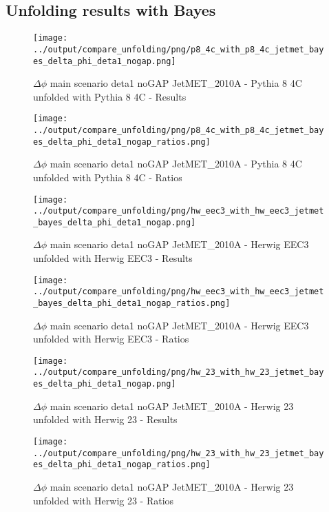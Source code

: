 \documentclass[11pt]{book}
\begin{document}
\subsection{Unfolding results with Bayes}

\begin{figure}[ht]
\centering
\texttt{[image: ../output/compare\_unfolding/png/p8\_4c\_with\_p8\_4c\_jetmet\_bayes\_delta\_phi\_deta1\_nogap.png]}
\caption{$\Delta\phi$ main scenario deta1 noGAP JetMET\_2010A - Pythia 8 4C unfolded with Pythia 8 4C - Results}
\label{p8_p8_jetmet_bayes_delta_phi_deta1_nogap_a}
\end{figure}

\begin{figure}[ht]
\centering
\texttt{[image: ../output/compare\_unfolding/png/p8\_4c\_with\_p8\_4c\_jetmet\_bayes\_delta\_phi\_deta1\_nogap\_ratios.png]}
\caption{$\Delta\phi$ main scenario deta1 noGAP JetMET\_2010A - Pythia 8 4C unfolded with Pythia 8 4C - Ratios}
\label{p8_p8_jetmet_bayes_delta_phi_deta1_nogap_b}
\end{figure}

\begin{figure}[ht]
\centering
\texttt{[image: ../output/compare\_unfolding/png/hw\_eec3\_with\_hw\_eec3\_jetmet\_bayes\_delta\_phi\_deta1\_nogap.png]}
\caption{$\Delta\phi$ main scenario deta1 noGAP JetMET\_2010A - Herwig EEC3 unfolded with Herwig EEC3 - Results}
\label{hw_eec3_hw_eec3_jetmet_bayes_delta_phi_deta1_nogap_a}
\end{figure}

\begin{figure}[ht]
\centering
\texttt{[image: ../output/compare\_unfolding/png/hw\_eec3\_with\_hw\_eec3\_jetmet\_bayes\_delta\_phi\_deta1\_nogap\_ratios.png]}
\caption{$\Delta\phi$ main scenario deta1 noGAP JetMET\_2010A - Herwig EEC3 unfolded with Herwig EEC3 - Ratios}
\label{hw_eec3_hw_eec3_jetmet_bayes_delta_phi_deta1_nogap_b}
\end{figure}

\begin{figure}[ht]
\centering
\texttt{[image: ../output/compare\_unfolding/png/hw\_23\_with\_hw\_23\_jetmet\_bayes\_delta\_phi\_deta1\_nogap.png]}
\caption{$\Delta\phi$ main scenario deta1 noGAP JetMET\_2010A - Herwig 23 unfolded with Herwig 23 - Results}
\label{hw_23_hw_23_jetmet_bayes_delta_phi_deta1_nogap_a}
\end{figure}

\begin{figure}[ht]
\centering
\texttt{[image: ../output/compare\_unfolding/png/hw\_23\_with\_hw\_23\_jetmet\_bayes\_delta\_phi\_deta1\_nogap\_ratios.png]}
\caption{$\Delta\phi$ main scenario deta1 noGAP JetMET\_2010A - Herwig 23 unfolded with Herwig 23 - Ratios}
\label{hw_23_hw_23_jetmet_bayes_delta_phi_deta1_nogap_b}
\end{figure}
\end{document}
